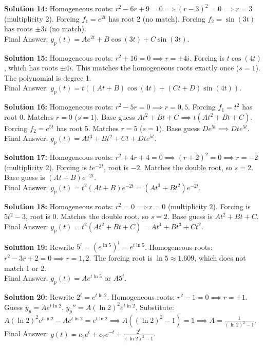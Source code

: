 \documentclass[11pt]{article}
\begin{document}
\textbf{Solution 14:}
Homogeneous roots: $r^2 - 6r + 9 = 0 \implies (r-3)^2 = 0 \implies r = 3$ (multiplicity 2). Forcing $f_1 = e^{2t}$ has root 2 (no match). Forcing $f_2 = \sin(3t)$ has roots $\pm 3i$ (no match). \\
Final Answer: $y_p(t) = Ae^{2t} + B\cos(3t) + C\sin(3t)$.

\textbf{Solution 15:}
Homogeneous roots: $r^2 + 16 = 0 \implies r = \pm 4i$. Forcing is $t\cos(4t)$, which has roots $\pm 4i$. This matches the homogeneous roots exactly once ($s=1$). The polynomial is degree 1. \\
Final Answer: $y_p(t) = t((At + B)\cos(4t) + (Ct + D)\sin(4t))$.

\textbf{Solution 16:}
Homogeneous roots: $r^2 - 5r = 0 \implies r = 0, 5$. Forcing $f_1 = t^2$ has root 0. Matches $r=0$ ($s=1$). Base guess $At^2+Bt+C \implies t(At^2+Bt+C)$. Forcing $f_2 = e^{5t}$ has root 5. Matches $r=5$ ($s=1$). Base guess $De^{5t} \implies Dte^{5t}$. \\
Final Answer: $y_p(t) = At^3 + Bt^2 + Ct + Dte^{5t}$.

\textbf{Solution 17:}
Homogeneous roots: $r^2 + 4r + 4 = 0 \implies (r+2)^2 = 0 \implies r = -2$ (multiplicity 2). Forcing is $te^{-2t}$, root is $-2$. Matches the double root, so $s=2$. Base guess is $(At+B)e^{-2t}$. \\
Final Answer: $y_p(t) = t^2(At+B)e^{-2t} = (At^3 + Bt^2)e^{-2t}$.

\textbf{Solution 18:}
Homogeneous roots: $r^2 = 0 \implies r = 0$ (multiplicity 2). Forcing is $5t^2 - 3$, root is 0. Matches the double root, so $s=2$. Base guess is $At^2+Bt+C$. \\
Final Answer: $y_p(t) = t^2(At^2+Bt+C) = At^4 + Bt^3 + Ct^2$.

\textbf{Solution 19:}
Rewrite $5^t = (e^{\ln 5})^t = e^{t\ln 5}$. Homogeneous roots: $r^2 - 3r + 2 = 0 \implies r = 1, 2$. The forcing root is $\ln 5 \approx 1.609$, which does not match 1 or 2. \\
Final Answer: $y_p(t) = Ae^{t\ln 5}$ or $A5^t$.

\textbf{Solution 20:}
Rewrite $2^t = e^{t\ln 2}$. Homogeneous roots: $r^2 - 1 = 0 \implies r = \pm 1$. Guess $y_p = Ae^{t\ln 2}$. $y_p'' = A(\ln 2)^2 e^{t\ln 2}$. Substitute: $A(\ln 2)^2 e^{t\ln 2} - Ae^{t\ln 2} = e^{t\ln 2} \implies A((\ln 2)^2 - 1) = 1 \implies A = \frac{1}{(\ln 2)^2 - 1}$. \\
Final Answer: $y(t) = c_1e^t + c_2e^{-t} + \frac{2^t}{(\ln 2)^2 - 1}$.
\end{document}
